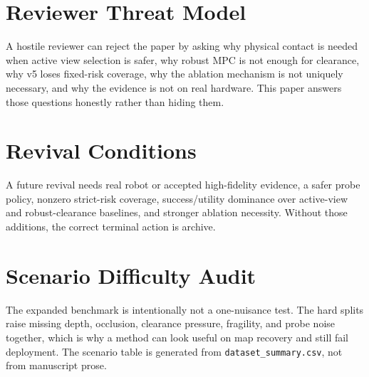 \documentclass{article}
\begin{document}
\citep{r101016jvisres201009001,r1011453571599,r101109lra20202969938,r101007s1051401796153,r101109roman20167745175} \citep{r101115detc99movic8434,r101109lra20213070308,r101109tie20182878157,r101109tii20233256369,r1048550arxiv211201871} \citep{r101109lra20233300544,r103390act15060280,r101109tte20253614254,r101109cvpr52733202401543,r103390ijgi12090381} \citep{r101109lra20213058072,r101109cvpr52733202401939,r101109roman20157333665,r101007978364223968716,r101021acsjctc9b01297} \citep{r101207s15516709cog23023,r103390robotics13100143,r101109lra20243494663,r101016jautcon2021103939,r1015607rss2021xvii066} \citep{r103390s24196270,r107717peerj11760,r101007s10846022015953,r101007s11423022100814,r101109tim20243427782} \citep{r101109cvpr52734202502073,r101109lra20213062004,r103390electronics14010153,r101109lra20213117254,r101109icra48891202310161505}

\section{Reviewer Threat Model}
A hostile reviewer can reject the paper by asking why physical contact is needed when active view selection is safer, why robust MPC is not enough for clearance, why v5 loses fixed-risk coverage, why the ablation mechanism is not uniquely necessary, and why the evidence is not on real hardware. This paper answers those questions honestly rather than hiding them.

\section{Revival Conditions}
A future revival needs real robot or accepted high-fidelity evidence, a safer probe policy, nonzero strict-risk coverage, success/utility dominance over active-view and robust-clearance baselines, and stronger ablation necessity. Without those additions, the correct terminal action is archive.

\section{Scenario Difficulty Audit}
The expanded benchmark is intentionally not a one-nuisance test. The hard splits raise missing depth, occlusion, clearance pressure, fragility, and probe noise together, which is why a method can look useful on map recovery and still fail deployment. The scenario table is generated from \texttt{dataset\_summary.csv}, not from manuscript prose.
\end{document}
